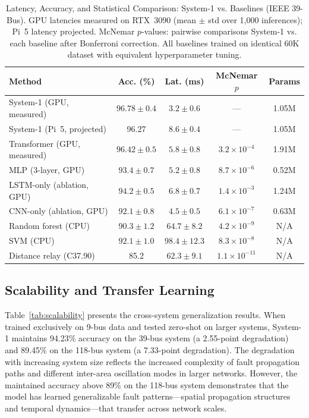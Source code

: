 \documentclass[journal]{IEEEtran}
\begin{document}
\begin{table}[!t]
\centering
\caption{Latency, Accuracy, and Statistical Comparison: System-1 vs. Baselines (IEEE 39-Bus). GPU latencies measured on RTX~3090 (mean $\pm$ std over 1,000 inferences); Pi~5 latency projected. McNemar $p$-values: pairwise comparisons System-1 vs. each baseline after Bonferroni correction. All baselines trained on identical 60K dataset with equivalent hyperparameter tuning.}
\label{tab:comparison}
\begin{tabular}{lcccc}
\toprule
\textbf{Method} & \textbf{Acc. (\%)} & \textbf{Lat. (ms)} & \textbf{McNemar $p$} & \textbf{Params} \\
\midrule
System-1 (GPU, measured)    & $96.78 \pm 0.4$ & $3.2 \pm 0.6$ & --- & 1.05M \\
System-1 (Pi~5, projected)  & 96.27 & $8.6 \pm 0.4$ & --- & 1.05M \\
Transformer (GPU, measured) & $96.42 \pm 0.5$ & $5.8 \pm 0.8$ & $3.2\!\times\!10^{-4}$ & 1.91M \\
MLP (3-layer, GPU)          & $93.4 \pm 0.7$  & $5.2 \pm 0.8$ & $8.7\!\times\!10^{-6}$ & 0.52M \\
LSTM-only (ablation, GPU)   & $94.2 \pm 0.5$  & $6.8 \pm 0.7$ & $1.4\!\times\!10^{-3}$ & 1.24M \\
CNN-only (ablation, GPU)    & $92.1 \pm 0.8$  & $4.5 \pm 0.5$ & $6.1\!\times\!10^{-7}$ & 0.63M \\
Random forest (CPU)         & $90.3 \pm 1.2$  & $64.7 \pm 8.2$ & $4.2\!\times\!10^{-9}$ & N/A \\
SVM (CPU)                   & $92.1 \pm 1.0$  & $98.4 \pm 12.3$ & $8.3\!\times\!10^{-8}$ & N/A \\
Distance relay (C37.90)     & 85.2  & $62.3 \pm 9.1$ & $1.1\!\times\!10^{-11}$ & N/A \\
\bottomrule
\end{tabular}
\end{table}

\subsection{Scalability and Transfer Learning}

Table~\ref{tab:scalability} presents the cross-system generalization results. When trained exclusively on 9-bus data and tested zero-shot on larger systems, System-1 maintains 94.23\% accuracy on the 39-bus system (a 2.55-point degradation) and 89.45\% on the 118-bus system (a 7.33-point degradation). The degradation with increasing system size reflects the increased complexity of fault propagation paths and different inter-area oscillation modes in larger networks. However, the maintained accuracy above 89\% on the 118-bus system demonstrates that the model has learned generalizable fault patterns---spatial propagation structures and temporal dynamics---that transfer across network scales.
\end{document}
